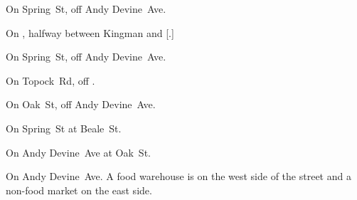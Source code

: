 
\begin{LocationList}

On Spring~St, off Andy Devine~Ave.

On , halfway between Kingman and [.]

\Location{\GasStation \Gas}
On Spring~St, off Andy Devine~Ave.

On Topock~Rd, off  .

On Oak~St, off Andy Devine~Ave.

On Spring~St at Beale~St.

\Location{\TruckService \Service \Rest}
On Andy Devine~Ave at Oak~St.

On  Andy Devine~Ave.
A food warehouse is on the west side of the street and a non-food market on the east side.

\end{LocationList}
